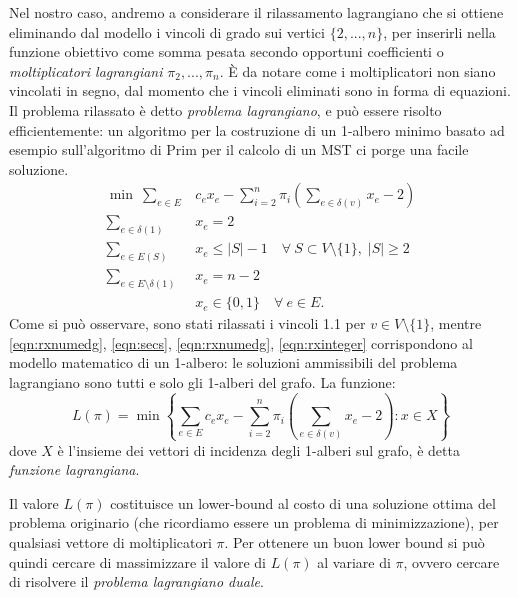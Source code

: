 Nel nostro caso, andremo a considerare il rilassamento lagrangiano che si ottiene eliminando dal modello i vincoli di grado sui vertici $\{2, ..., n\}$, per inserirli nella funzione obiettivo come somma pesata secondo opportuni coefficienti o \emph{moltiplicatori lagrangiani} $\pi_2, ..., \pi_n$. È da notare come i moltiplicatori non siano vincolati in segno, dal momento che i vincoli eliminati sono in forma di equazioni. Il problema rilassato è detto \emph{problema lagrangiano}, e può essere risolto efficientemente: un algoritmo per la costruzione di un 1-albero minimo basato ad esempio sull'algoritmo di Prim per il calcolo di un MST ci porge una facile soluzione.
\begin{align}
  \min \ \sum_{e \in E} & c_ex_e - \sum^n_{i = 2}\pi_i(\sum_{e \in \delta(v)}x_e - 2) \label{eqn:rxof}\\
  \sum_{e \in \delta(1)} & x_e = 2 \label{eqn:rxdegconst}\\
  \sum_{e \in E(S)}  & x_e \leq |S| - 1 \quad\forall\: S \subset V \setminus \{ 1 \},\; | S | \geq 2 \label{eqn:secs}\\
  \sum_{e \in E \setminus \delta(1)} & x_e = n - 2 \label{eqn:rxnumedg}\\
  & x_e \in \{0,1\}  \quad \forall\: e \in E. \label{eqn:rxinteger}
\end{align}
Come si può osservare, sono stati rilassati i vincoli 1.1 per $v \in V \setminus \{ 1 \}$, mentre \ref{eqn:rxnumedg}, \ref{eqn:secs}, \ref{eqn:rxnumedg}, \ref{eqn:rxinteger} corrispondono al modello matematico di un 1-albero: le soluzioni ammissibili del problema lagrangiano sono tutti e solo gli 1-alberi del grafo. La funzione:
\begin{equation}
L(\pi) = \min \left\{ \sum_{e \in E} c_ex_e - \sum^n_{i = 2}\pi_i(\sum_{e \in \delta(v)}x_e - 2) : x \in X \right\}
\end{equation}
dove $X$ è l'insieme dei vettori di incidenza degli 1-alberi sul grafo, è detta 	\emph{funzione lagrangiana}.

Il valore $L(\pi)$ costituisce un lower-bound al costo di una soluzione ottima del problema originario (che ricordiamo essere un problema di minimizzazione), per qualsiasi vettore di moltiplicatori $\pi$. Per ottenere un buon lower bound si può quindi cercare di massimizzare il valore di $L(\pi)$ al variare di $\pi$, ovvero cercare di risolvere il \emph{problema lagrangiano duale}.

